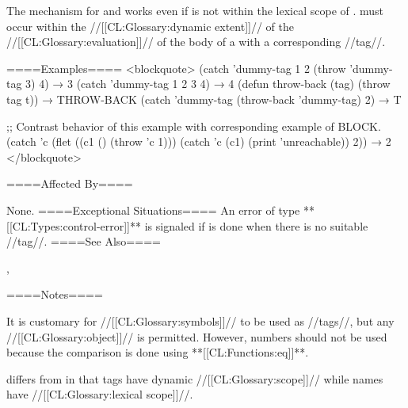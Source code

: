 The mechanism for  and  works even if  is not within the lexical scope of .  must occur within the //[[CL:Glossary:dynamic extent]]// of the //[[CL:Glossary:evaluation]]// of the body of a  with a corresponding //tag//.

====Examples==== <blockquote> (catch 'dummy-tag 1 2 (throw 'dummy-tag 3) 4) → 3 (catch 'dummy-tag 1 2 3 4) → 4 (defun throw-back (tag) (throw tag t)) → THROW-BACK (catch 'dummy-tag (throw-back 'dummy-tag) 2) → T

;; Contrast behavior of this example with corresponding example of BLOCK. (catch 'c (flet ((c1 () (throw 'c 1))) (catch 'c (c1) (print 'unreachable)) 2)) → 2 </blockquote>

====Affected By====

None. ====Exceptional Situations==== An error of type **[[CL:Types:control-error]]** is signaled if  is done when there is no suitable  //tag//. ====See Also====

, {\secref\Evaluation}

====Notes====

It is customary for //[[CL:Glossary:symbols]]// to be used as //tags//, but any //[[CL:Glossary:object]]// is permitted. However, numbers should not be used because the comparison is done using **[[CL:Functions:eq]]**.

 differs from  in that  tags have dynamic //[[CL:Glossary:scope]]// while  names have //[[CL:Glossary:lexical scope]]//.


